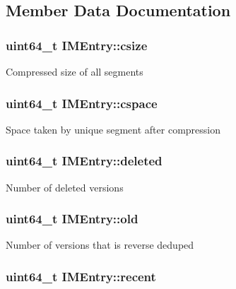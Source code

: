 \subsection{\-Member \-Data \-Documentation}
\hypertarget{structIMEntry_a26e479602ebff2d35dde9675b955109e}{
\subsubsection[{csize}]{\setlength{\rightskip}{0pt plus 5cm}uint64\-\_\-t {\bf \-I\-M\-Entry\-::csize}}}\label{structIMEntry_a26e479602ebff2d35dde9675b955109e}
\-Compressed size of all segments \hypertarget{structIMEntry_ae9b6648d5d7b3202d5eb238274d13045}{
\subsubsection[{cspace}]{\setlength{\rightskip}{0pt plus 5cm}uint64\-\_\-t {\bf \-I\-M\-Entry\-::cspace}}}\label{structIMEntry_ae9b6648d5d7b3202d5eb238274d13045}
\-Space taken by unique segment after compression \hypertarget{structIMEntry_afd078d7ebeb106f755357249ebcc6259}{
\subsubsection[{deleted}]{\setlength{\rightskip}{0pt plus 5cm}uint64\-\_\-t {\bf \-I\-M\-Entry\-::deleted}}}\label{structIMEntry_afd078d7ebeb106f755357249ebcc6259}
\-Number of deleted versions \hypertarget{structIMEntry_abe5de096d4285431956070f601c8d086}{
\subsubsection[{old}]{\setlength{\rightskip}{0pt plus 5cm}uint64\-\_\-t {\bf \-I\-M\-Entry\-::old}}}\label{structIMEntry_abe5de096d4285431956070f601c8d086}
\-Number of versions that is reverse deduped \hypertarget{structIMEntry_acb4d7a375160308d5fb701a631685936}{
\subsubsection[{recent}]{\setlength{\rightskip}{0pt plus 5cm}uint64\-\_\-t {\bf \-I\-M\-Entry\-::recent}}}\label{structIMEntry_acb4d7a375160308d5fb701a631685936}
